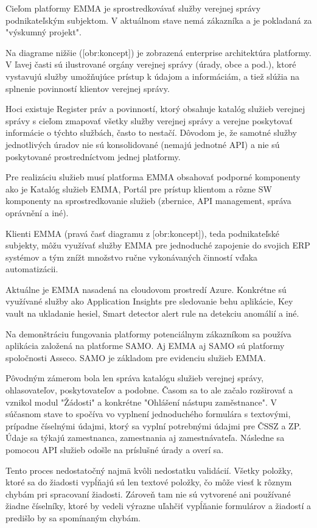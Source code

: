 Cieľom platformy EMMA je sprostredkovávať služby verejnej správy podnikateľským subjektom. V aktuálnom stave nemá zákazníka a je pokladaná za "výskumný projekt".

Na diagrame nižšie ([obr:koncept]) je zobrazená enterprise architektúra platformy. V ľavej časti sú ilustrované orgány verejnej správy (úrady, obce a pod.), ktoré vystavujú služby umožňujúce prístup k údajom a informáciám, a tiež slúžia na splnenie povinností klientov verejnej správy.

Hoci existuje Register práv a povinností, ktorý obsahuje katalóg služieb verejnej správy s cieľom zmapovať všetky služby verejnej správy a verejne poskytovať informácie o týchto službách, často to nestačí. Dôvodom je, že samotné služby jednotlivých úradov nie sú konsolidované (nemajú jednotné API) a nie sú poskytované prostredníctvom jednej platformy.

Pre realizáciu služieb musí platforma EMMA obsahovať podporné komponenty ako je Katalóg služieb EMMA, Portál pre prístup klientom a rôzne SW komponenty na sprostredkovanie služieb (zbernice, API management, správa oprávnění a iné). 

Klienti EMMA (pravá časť diagramu z [obr:koncept]), teda podnikateľské subjekty, môžu využívať služby EMMA pre jednoduché zapojenie do svojich ERP systémov a tým znížt množstvo ručne vykonávaných činností vďaka automatizácii.

Aktuálne je EMMA nasadená na cloudovom prostredí Azure. Konkrétne sú využívané služby ako Application Insights pre sledovanie behu aplikácie, Key vault na ukladanie hesiel, Smart detector alert rule na detekciu anomálií a iné. 

Na demonštráciu fungovania platformy potenciálnym zákazníkom sa používa aplikácia založená na platforme SAMO. Aj EMMA aj SAMO sú platformy spoločnosti Asseco. SAMO je základom pre evidenciu služieb EMMA.

Pôvodným zámerom bola len správa katalógu služieb verejnej správy, ohlasovateľov, poskytovateľov a podobne. Časom sa to ale začalo rozširovať a vznikol modul "Žádosti" a konkrétne "Ohlášení nástupu zaměstnance". V súčasnom stave to spočíva vo vyplnení jednoduchého formulára s textovými, prípadne číselnými údajmi, ktorý sa vyplní potrebnými údajmi pre ČSSZ a ZP. Údaje sa týkajú zamestnanca, zamestnania aj zamestnávateľa. Následne sa pomocou API služieb odošle na príslušné úrady a overí sa.

Tento proces nedostatočný najmä kvôli nedostatku validácií. Všetky položky, ktoré sa do žiadosti vypĺňajú sú len textové položky, čo môže viesť k rôznym chybám pri spracovaní žiadosti. Zároveň tam nie sú vytvorené ani používané žiadne číselníky, ktoré by vedeli výrazne uľahčiť vypĺňanie formulárov a žiadostí a predišlo by sa spomínaným chybám.


